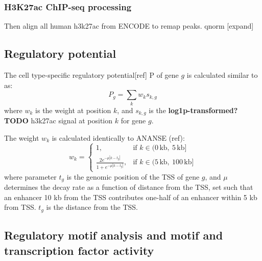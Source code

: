 \subsubsection{H3K27ac ChIP-seq processing}

Then align all human h3k27ac from ENCODE to remap peaks. qnorm \cite{qnorm}
[expand]

\subsection{Regulatory potential}

The cell type-specific regulatory potential[ref] P of gene $g$ is calculated similar to as:
        \begin{equation*}
            P_g = \sum_k w_{k}s_{k,g}
        \end{equation*}
        where $w_k$ is the weight at position $k$, and $s_{k,g}$ is the \textbf{log1p-transformed? TODO} h3k27ac signal at position $k$ for gene $g$.
        
The weight $w_k$ is calculated identically to ANANSE (ref):
        \begin{equation*}
            w_k = \begin{cases}
                1, & \text{if } k \in (0\,\text{kb},\ 5\,\text{kb}] \\
                \frac{2e^{-\mu|k-t_g|}}{1+e^{-\mu|k-t_g|}}, & \text{if } k \in (5\,\text{kb},\ 100\,\text{kb}]
            \end{cases}
        \end{equation*}
        where parameter $t_g$ is the genomic position of the TSS of gene $g$, and $\mu$ determines the decay rate as a function of distance from the TSS, set such that an enhancer 10 kb from the TSS contributes one-half of an enhancer within 5 kb from TSS. $t_g$ is the distance from the TSS.


\subsection{Regulatory motif analysis and motif and transcription factor activity}

